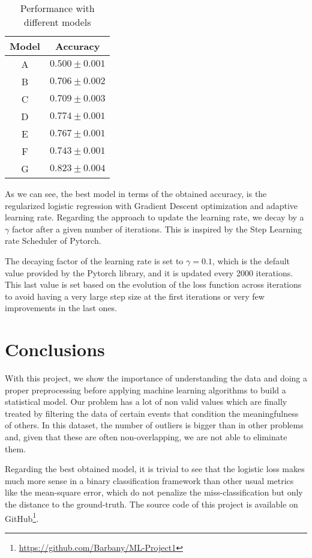 \documentclass[10pt,conference,compsocconf]{IEEEtran}
\begin{document}
\begin{table}[htbp]
  \centering
  \begin{tabular}[c]{|c|c|}
    \hline
    Model & Accuracy \\
    \hline
    A & $0.500 \pm 0.001$\\
    B & $0.706 \pm 0.002$\\
    C & $0.709 \pm 0.003$\\
    D & $0.774 \pm 0.001$\\
    E & $0.767 \pm 0.001$\\
    F & $0.743 \pm 0.001$\\
    G & $0.823 \pm 0.004$\\
    \hline
  \end{tabular}
  \caption{Performance with different models}
  \label{tab:models}
\end{table}

As we can see, the best model in terms of the obtained accuracy, is the regularized logistic regression with Gradient Descent optimization and adaptive learning rate. Regarding the approach to update the learning rate, we decay by a $\gamma$ factor after a given number of iterations. This is inspired by the Step Learning rate Scheduler of Pytorch\cite{pytorch}.

The decaying factor of the learning rate is set to $\gamma=0.1$, which is the default value provided by the Pytorch library, and it is updated every 2000 iterations. This last value is set based on the evolution of the loss function across iterations to avoid having a very large step size at the first iterations or very few improvements in the last ones.

\section{Conclusions}
\label{sec:conclusions}
With this project, we show the importance of understanding the data and doing a proper preprocessing before applying machine learning algorithms to build a statistical model. Our problem has a lot of non valid values which are finally treated by filtering the data of certain events that condition the meaningfulness of others. In this dataset, the number of outliers is bigger than in other problems and, given that these are often non-overlapping, we are not able to eliminate them.

Regarding the best obtained model, it is trivial to see that the logistic loss makes much more sense in a binary classification framework than other usual metrics like the mean-square error, which do not penalize the miss-classification but only the distance to the ground-truth. The source code of this project is available on GitHub\footnote{\url{https://github.com/Barbany/ML-Project1}}.




\end{document}
